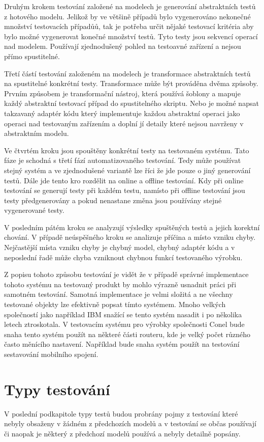 Druhým krokem testování založené na modelech je generování abstraktních testů z hotového modelu. Jelikož by ve většině případů bylo vygenerováno nekonečné množství testovacích případůů, tak je potřeba určit nějaké testovací kritéria aby bylo možné vygenerovat konečné množství testů. Tyto testy jsou sekvencí operací nad modelem. Používají zjednodušený pohled na testoavné zařízení a nejsou přímo spustitelné.

Třetí částí testování založeném na modelech je transformace abstraktních testů na spustitelné konkrétní testy. Transformace může být prováděna dvěma způsoby. Prvním způsobem je transformační nástroj, která používá šoblony a mapuje každý abstraktní testovací případ do spustitelného skriptu. Nebo je možné napsat takzavaný adaptér kódu který implementuje každou abstraktní operaci jako operaci nad testovaným zařízením a doplní jí detaily které nejsou navrženy v abstraktním modelu.

Ve čtvrtém kroku jsou spouštěny konkrétní testy na testovaném systému. Tato fáze je schodná s třetí fází automatizovaného testování. Tedy může používat stejný systém a ve zjednodušené variantě lze říci že jde pouze o jiný generování testů. Dále jde tento kro rozdělit na online a offline testování. Kdy při online testování se generují testy při každém testu, namísto při offline testování jsou testy předgenerovány a pokud nenastane změna jsou používány stejné vygenerované testy.

V posledním pátém kroku se analyzují výsledky spuštěných testů a jejich korektní chování. V případě neúspěšného kroku se analizuje příčina a místo vzniku chyby. Nejčastější místa vzniku chyby je chybný model, chybný adaptér kódu a v neposlední řadě může chyba vzniknout chybnou funkcí testovaného výrobku.

Z popisu tohoto způsobu testování je vidět  že v případě správné implementace tohoto systému na testovaný produkt by mohlo výrazně usnadnit práci při samotném testování. Samotná implementace je velmi složitá a ne všechny testované objekty lze efektivně popsat tímto systémem. Mnoho velkých společností jako například IBM snažící se tento systém nasadit i po několika letech ztroskotala. V testovacím systému pro výrobky společnosti Conel bude snaha tento systém použít na některé části routeru, kde je velký počet různého často měnícího nastavení. Například bude snaha systém použít na testování sestavování mobilního spojení.

\section{Typy testování}
V poslední podkapitole typy testů budou probrány pojmy z testování které nebyly obsaženy v žádném z předchozích modelů a v testování se občas používají či naopak je některý z předchozí modelů používá a nebyly detailně popsány.

